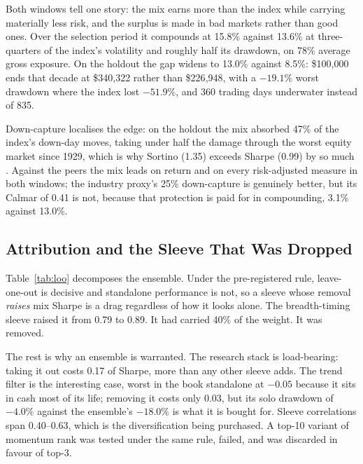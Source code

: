 \documentclass[conference]{IEEEtran}
\begin{document}
Both windows tell one story: the mix earns more than the index while carrying
materially less risk, and the surplus is made in bad markets rather than good
ones. Over the selection period it compounds at 15.8\% against 13.6\% at
three-quarters of the index's volatility and roughly half its drawdown, on 78\%
average gross exposure. On the holdout the gap widens to 13.0\% against 8.5\%:
\$100{,}000 ends that decade at \$340{,}322 rather than \$226{,}948, with a
$-19.1\%$ worst drawdown where the index lost $-51.9\%$, and 360 trading days
underwater instead of 835.

Down-capture localises the edge: on the holdout the mix absorbed 47\% of the
index's down-day moves, taking under half the damage through the worst equity
market since 1929, which is why Sortino (1.35) exceeds Sharpe (0.99) by so much
\cite{sortino1994downside}. Against the peers the mix leads on return and on
every risk-adjusted measure in both windows; the industry proxy's 25\%
down-capture is genuinely better, but its Calmar of 0.41 is not, because that
protection is paid for in compounding, 3.1\% against 13.0\%.

\subsection{Attribution and the Sleeve That Was Dropped}

Table~\ref{tab:loo} decomposes the ensemble. Under the pre-registered rule,
leave-one-out is decisive and standalone performance is not, so a sleeve whose
removal \emph{raises} mix Sharpe is a drag regardless of how it looks alone.
The breadth-timing sleeve raised it from 0.79 to 0.89. It had carried 40\% of
the weight. It was removed.

The rest is why an ensemble is warranted. The research stack is load-bearing:
taking it out costs 0.17 of Sharpe, more than any other sleeve adds. The trend
filter is the interesting case, worst in the book standalone at $-0.05$ because
it sits in cash most of its life; removing it costs only 0.03, but its solo
drawdown of $-4.0\%$ against the ensemble's $-18.0\%$ is what it is bought for.
Sleeve correlations span 0.40--0.63, which is the diversification being
purchased. A top-10 variant of momentum rank was tested under the same rule,
failed, and was discarded in favour of top-3.
\end{document}

